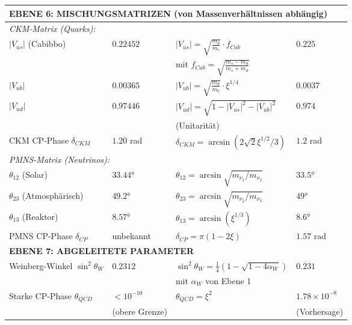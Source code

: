 \documentclass[12pt,a4paper]{article}
\theoremstyle{definition}
\begin{document}
\begin{longtable}{p{5cm}p{4cm}p{3.5cm}p{3.5cm}}
	\midrule
	\multicolumn{4}{l}{\textbf{EBENE 6: MISCHUNGSMATRIZEN (von Massenverhältnissen abhängig)}} \\
	\midrule
	
	\multicolumn{4}{l}{\textit{CKM-Matrix (Quarks):}} \\
	
	$|V_{us}|$ (Cabibbo) & $0.22452$ & $|V_{us}| = \sqrt{\frac{m_d}{m_s}} \cdot f_{Cab}$ & $0.225$ \\
	& & mit $f_{Cab} = \sqrt{\frac{m_s - m_d}{m_s + m_d}}$ & \\[0.3em]
	
	$|V_{ub}|$ & $0.00365$ & $|V_{ub}| = \sqrt{\frac{m_d}{m_b}} \cdot \xi^{1/4}$ & $0.0037$ \\
	
	$|V_{ud}|$ & $0.97446$ & $|V_{ud}| = \sqrt{1 - |V_{us}|^2 - |V_{ub}|^2}$ & $0.974$ \\
	& & (Unitarität) & \\[0.3em]
	
	CKM CP-Phase $\delta_{CKM}$ & $1.20$ rad & $\delta_{CKM} = \arcsin(2\sqrt{2}\xi^{1/2}/3)$ & $1.2$ rad \\
	
	\multicolumn{4}{l}{\textit{PMNS-Matrix (Neutrinos):}} \\
	
	$\theta_{12}$ (Solar) & $33.44°$ & $\theta_{12} = \arcsin\sqrt{m_{\nu_1}/m_{\nu_2}}$ & $33.5°$ \\
	
	$\theta_{23}$ (Atmosphärisch) & $49.2°$ & $\theta_{23} = \arcsin\sqrt{m_{\nu_2}/m_{\nu_3}}$ & $49°$ \\
	
	$\theta_{13}$ (Reaktor) & $8.57°$ & $\theta_{13} = \arcsin(\xi^{1/3})$ & $8.6°$ \\
	
	PMNS CP-Phase $\delta_{CP}$ & unbekannt & $\delta_{CP} = \pi(1 - 2\xi)$ & $1.57$ rad \\
	
	\midrule
	\multicolumn{4}{l}{\textbf{EBENE 7: ABGELEITETE PARAMETER}} \\
	\midrule
	
	Weinberg-Winkel $\sin^2\theta_W$ & $0.2312$ & $\sin^2\theta_W = \frac{1}{4}(1-\sqrt{1-4\alpha_W})$ & $0.231$ \\
	& & mit $\alpha_W$ von Ebene 1 & \\[0.3em]
	
	Starke CP-Phase $\theta_{QCD}$ & $< 10^{-10}$ & $\theta_{QCD} = \xi^{2}$ & $1.78 \times 10^{-8}$ \\
	& (obere Grenze) & & (Vorhersage) \\
	
\end{longtable}
\end{document}
